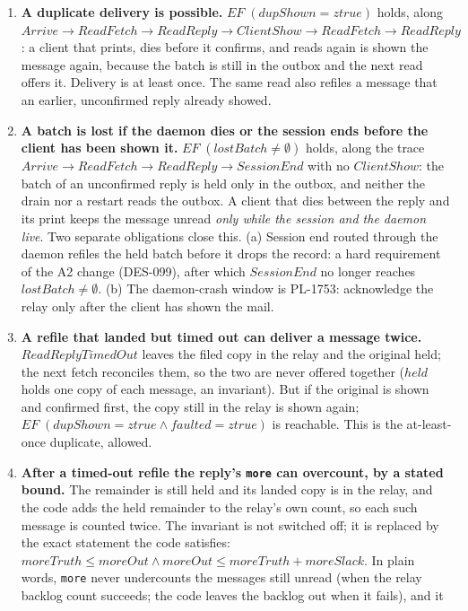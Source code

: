 \documentclass[a4paper,10pt,fleqn]{article}
\begin{document}
\begin{enumerate}
  \item \textbf{A duplicate delivery is possible.}  $EF\;(dupShown = ztrue)$
    holds, along $Arrive \to ReadFetch \to ReadReply \to ClientShow \to
    ReadFetch \to ReadReply$: a client that prints, dies before it confirms,
    and reads again is shown the message again, because the batch is still in
    the outbox and the next read offers it.  Delivery is at least once.  The same read also
    refiles a message that an earlier, unconfirmed reply already showed.
  \item \textbf{A batch is lost if the daemon dies or the session ends
    before the client has been shown it.}  $EF\;(lostBatch \neq \emptyset)$
    holds, along the trace $Arrive \to ReadFetch \to ReadReply \to
    SessionEnd$ with no $ClientShow$: the batch of an unconfirmed reply is
    held only in the outbox, and neither the drain nor a restart reads the
    outbox.  A client that dies between the reply and its print keeps the
    message unread \emph{only while the session and the daemon live}.  Two
    separate obligations close this.  (a) Session end routed through the
    daemon refiles the held batch before it drops the record: a hard
    requirement of the A2 change (DES-099), after which $SessionEnd$ no longer
    reaches $lostBatch \neq \emptyset$.  (b) The daemon-crash window is
    PL-1753: acknowledge the relay only after the client has shown the mail.
  \item \textbf{A refile that landed but timed out can deliver a message
    twice.}  $ReadReplyTimedOut$ leaves the filed copy in the relay and the
    original held; the next fetch reconciles them, so the two are never offered
    together ($held$ holds one copy of each message, an invariant).  But if the
    original is shown and confirmed first, the copy still in the relay is shown
    again; $EF\;(dupShown = ztrue \land faulted = ztrue)$ is reachable.
    This is the at-least-once duplicate, allowed.
  \item \textbf{After a timed-out refile the reply's \texttt{more} can
    overcount, by a stated bound.}  The remainder is still held and its landed
    copy is in the relay, and the code adds the held remainder to the relay's
    own count, so each such message is counted twice.  The invariant is not
    switched off; it is replaced by the exact statement the code satisfies:
    $moreTruth \leq moreOut \land moreOut \leq moreTruth + moreSlack$.  In plain
    words, \texttt{more} never undercounts the messages still unread (when the relay backlog count succeeds; the code leaves the backlog out when it fails), and it

\end{enumerate}
\end{document}
